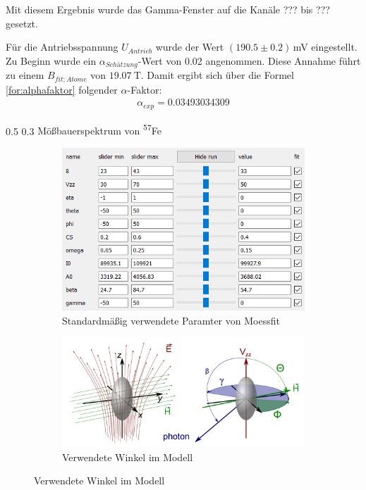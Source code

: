 \documentclass[german, %
parskip=full, %
bibliography=totoc, %
]{scrartcl}
\makeatletter
\renewcommand\subsection{\@startsection 
   {subsection}{2}{0mm}%
   {0.5\baselineskip}%
   {0.3\baselineskip}%
   {\bfseries\sffamily\large}%
   }
\makeatother
\begin{document}
Mit diesem Ergebnis wurde das Gamma-Fenster auf die Kanäle ??? bis ??? gesetzt.

Für die Antriebsspannung $U_{Antrieb}$ wurde der Wert $(190.5 \pm 0.2)$\,mV eingestellt. Zu Beginn wurde ein $\alpha_{Schätzung}$-Wert von 0.02 angenommen. Diese Annahme führt zu einem $B_{fit;Atome}$ von \(\SI{19.07}{\tesla}\). Damit ergibt sich über die Formel \ref{for:alphafaktor} folgender $\alpha$-Faktor:
\begin{align*}
\alpha_{exp} = 0.03493034309
\end{align*} 

\subsection{Mößbauerspektrum von \textsuperscript{57}Fe}

\begin{figure}[ht]
	\centering
	\begin{subfigure}[b]{0.4\textwidth}
		\includegraphics[width=\textwidth]{Moessfitstandard}
	  \caption{Standardmäßig verwendete Paramter von Moessfit}
	  \label{fig:moessfitstandard}
  \end{subfigure}
  \begin{subfigure}[b]{0.5\textwidth}
	  \includegraphics[width=\textwidth]{Winkel}
	  \caption{Verwendete Winkel im Modell}
	  \label{fig:winkel}
  \end{subfigure}
\end{figure}
\end{document}
